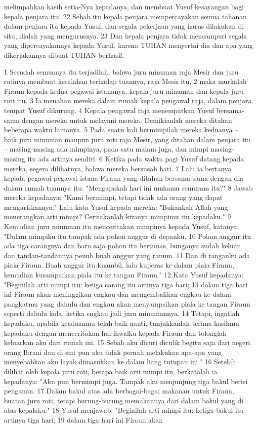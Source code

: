 \begin{biblechapter}
melimpahkan kasih setia-Nya kepadanya, dan membuat Yusuf kesayangan bagi kepala penjara itu. 22 Sebab itu kepala penjara mempercayakan semua tahanan dalam penjara itu kepada Yusuf, dan segala pekerjaan yang harus dilakukan di situ, dialah yang mengurusnya. 23 Dan kepala penjara tidak mencampuri segala yang dipercayakannya kepada Yusuf, karena TUHAN menyertai dia dan apa yang dikerjakannya dibuat TUHAN berhasil.
\end{biblechapter}

\begin{biblechapter} %
1 Sesudah semuanya itu terjadilah, bahwa juru minuman raja Mesir dan juru rotinya membuat kesalahan terhadap tuannya, raja Mesir itu, 2 maka murkalah Firaun kepada kedua pegawai istananya, kepala juru minuman dan kepala juru roti itu. 3 Ia menahan mereka dalam rumah kepala pengawal raja, dalam penjara tempat Yusuf dikurung. 4 Kepala pengawal raja menempatkan Yusuf bersama-sama dengan mereka untuk melayani mereka. Demikianlah mereka ditahan beberapa waktu lamanya. 5 Pada suatu kali bermimpilah mereka keduanya -- baik juru minuman maupun juru roti raja Mesir, yang ditahan dalam penjara itu -- masing-masing ada mimpinya, pada satu malam juga, dan mimpi masing-masing itu ada artinya sendiri. 6 Ketika pada waktu pagi Yusuf datang kepada mereka, segera dilihatnya, bahwa mereka bersusah hati. 7 Lalu ia bertanya kepada pegawai-pegawai istana Firaun yang ditahan bersama-sama dengan dia dalam rumah tuannya itu: "Mengapakah hari ini mukamu semuram itu?" 8 Jawab mereka kepadanya: "Kami bermimpi, tetapi tidak ada orang yang dapat mengartikannya." Lalu kata Yusuf kepada mereka: "Bukankah Allah yang menerangkan arti mimpi? Ceritakanlah kiranya mimpimu itu kepadaku." 9 Kemudian juru minuman itu menceritakan mimpinya kepada Yusuf, katanya: "Dalam mimpiku itu tampak ada pohon anggur di depanku. 10 Pohon anggur itu ada tiga carangnya dan baru saja pohon itu bertunas, bunganya sudah keluar dan tandan-tandannya penuh buah anggur yang ranum. 11 Dan di tanganku ada piala Firaun. Buah anggur itu kuambil, lalu kuperas ke dalam piala Firaun, kemudian kusampaikan piala itu ke tangan Firaun." 12 Kata Yusuf kepadanya: "Beginilah arti mimpi itu: ketiga carang itu artinya tiga hari; 13 dalam tiga hari ini Firaun akan meninggikan engkau dan mengembalikan engkau ke dalam pangkatmu yang dahulu dan engkau akan menyampaikan piala ke tangan Firaun seperti dahulu kala, ketika engkau jadi juru minumannya. 14 Tetapi, ingatlah kepadaku, apabila keadaanmu telah baik nanti, tunjukkanlah terima kasihmu kepadaku dengan menceritakan hal ihwalku kepada Firaun dan tolonglah keluarkan aku dari rumah ini. 15 Sebab aku dicuri diculik begitu saja dari negeri orang Ibrani dan di sini pun aku tidak pernah melakukan apa-apa yang menyebabkan aku layak dimasukkan ke dalam liang tutupan ini." 16 Setelah dilihat oleh kepala juru roti, betapa baik arti mimpi itu, berkatalah ia kepadanya: "Aku pun bermimpi juga. Tampak aku menjunjung tiga bakul berisi penganan. 17 Dalam bakul atas ada berbagai-bagai makanan untuk Firaun, buatan juru roti, tetapi burung-burung memakannya dari dalam bakul yang di atas kepalaku." 18 Yusuf menjawab: "Beginilah arti mimpi itu: ketiga bakul itu artinya tiga hari; 19 dalam tiga hari ini Firaun akan 
\end{biblechapter}
